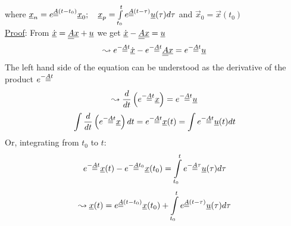 where $\vec{x}_n=e^{\mat{A}(t-t_0)}\vec{x}_0;\quad \vec{x}_p=\int\limits_{t_0}^t e^{\mat{A}(t-\tau)}\vec{u}(\tau)d\tau$ and $\vec{x}_0=\vec{x}(t_0)$\\
\underline{Proof}: From $\dot{\vec{x}}=\mat{A}\vec{x}+\vec{u}$ we get $\dot{\vec{x}}-\mat{A}\vec{x}=\vec{u}$
\begin{equation*}
	\leadsto e^{-\mat{A}t}\dot{\vec{x}}-e^{-\mat{A}t}\mat{A}\vec{x}=e^{-\mat{A}t}\vec{u}
\end{equation*}
The left hand side of the equation can be understood as the derivative of the product $e^{-\mat{A}t}$
\begin{equation*}
	\leadsto \frac{d}{dt}\left(e^{-\mat{A}t}\vec{x}\right)=e^{-\mat{A}t}\vec{u}
\end{equation*}
\begin{equation*}
	\int \frac{d}{dt}\left(e^{-\mat{A}t}\vec{x}\right)dt = e^{-\mat{A}t}\vec{x}(t)=\int e^{-\mat{A}t}\vec{u}(t)dt
\end{equation*}
Or, integrating from $t_0$ to $t$:
\begin{equation*}
	e^{-\mat{A}t}\vec{x}(t)-e^{-\mat{A}t_0}\vec{x}(t_0)=\int\limits_{t_0}^{t}e^{-\mat{A}\tau}\vec{u}(\tau)d\tau
\end{equation*}
\begin{equation*}
	\leadsto \vec{x}(t)=e^{\mat{A}(t-t_0)}\vec{x}(t_0)+\int\limits_{t_0}^te^{\mat{A}(t-\tau)}\vec{u}(\tau)d\tau
\end{equation*}
